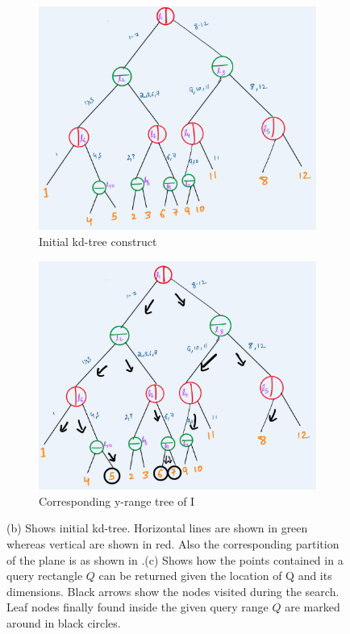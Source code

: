 \begin{figure}[H]
     \begin{subfigure}[b]{0.45\textwidth}
         \centering
         \includegraphics[width=\textwidth]{Images/kdinit.jpg}
         \caption{Initial kd-tree construct}
         \label{fig:kdinit}
     \end{subfigure}
    \hfill
     \begin{subfigure}[b]{0.5\textwidth}
         \centering
         \includegraphics[width=\textwidth]{Images/kdfin.jpg}
         \caption{Corresponding y-range tree of I}
         \label{fig:kdfin}
     \end{subfigure}
        \caption{(b) Shows initial kd-tree. Horizontal lines are shown in green whereas vertical are shown in red. Also the corresponding partition of the plane is as shown in .(c) Shows how the points contained in a query rectangle $Q$ can be returned given the location of Q and its dimensions. Black arrows show the nodes visited during the search. Leaf nodes finally found inside the given query range $Q$ are marked around in black circles.}
        \label{fig:kdall}
\end{figure}



